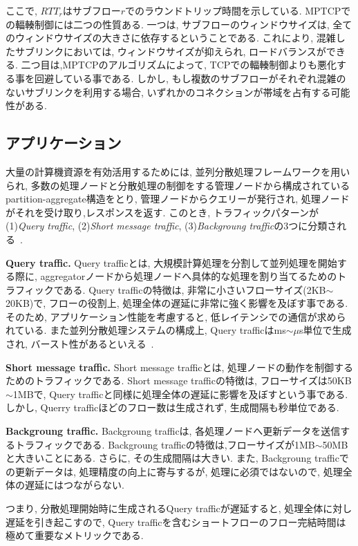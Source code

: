 \documentclass[11pt, a4paper, uplatex]{jsarticle}
\begin{document}
ここで, $RTT_r$はサブフロー$r$でのラウンドトリップ時間を示している.
MPTCPでの輻輳制御には二つの性質ある.
一つは, サブフローのウィンドウサイズは, 全てのウィンドウサイズの大きさに依存するということである.
これにより, 混雑したサブリンクにおいては, ウィンドウサイズが抑えられ, ロードバランスができる.
二つ目は,MPTCPのアルゴリズムによって, TCPでの輻輳制御よりも悪化する事を回避している事である.
しかし, もし複数のサブフローがそれぞれ混雑のないサブリンクを利用する場合, いずれかのコネクションが帯域を占有する可能性がある.

\subsection{アプリケーション}

大量の計算機資源を有効活用するためには,
並列分散処理フレームワークを用いられ, 多数の処理ノードと分散処理の制御をする管理ノードから構成されているpartition-aggregate構造をとり,
管理ノードからクエリーが発行され, 処理ノードがそれを受け取り,レスポンスを返す.
このとき, トラフィックパターンが  (1){\it Query traffic}, (2){\it Short message
traffic}, (3){\it Backgroung traffic}の3つに分類される~\cite{dctcp}.

{\bf Query traffic. }Query trafficとは, 大規模計算処理を分割して並列処理を開始する際に,
aggregatorノードから処理ノードへ具体的な処理を割り当てるためのトラフィックである.
Query trafficの特徴は, 非常に小さいフローサイズ(2KB$\sim$20KB)で,
フローの役割上, 処理全体の遅延に非常に強く影響を及ぼす事である.
そのため, アプリケーション性能を考慮すると, 低レイテンシでの通信が求められている.
また並列分散処理システムの構成上, Query trafficはms$\sim \mu$s単位で生成され,
バースト性があるといえる~\cite{dctcp}.

{\bf Short message traffic. } Short message trafficとは,
処理ノードの動作を制御するためのトラフィックである.
Short message trafficの特徴は, フローサイズは50KB$\sim$1MBで, Query
trafficと同様に処理全体の遅延に影響を及ぼすという事である.
しかし, Querry trafficほどのフロー数は生成されず, 生成間隔も秒単位である.

{\bf Backgroung traffic. }Backgroung trafficは,
各処理ノードへ更新データを送信するトラフィックである.
Backgroung trafficの特徴は,フローサイズが1MB$\sim$50MBと大きいことにある.
さらに, その生成間隔は大きい.
また, Backgroung trafficでの更新データは, 処理精度の向上に寄与するが, 処理に必須ではないので,
処理全体の遅延にはつながらない.

つまり, 分散処理開始時に生成されるQuery trafficが遅延すると,
処理全体に対し遅延を引き起こすので, Query trafficを含むショートフローのフロー完結時間は極めて重要なメトリックである.
\end{document}
